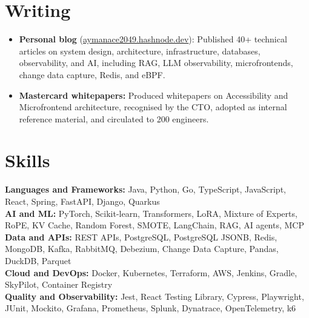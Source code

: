 \documentclass[a4paper,10pt]{article}
\newcommand{\skill}[2]{
  \textbf{#1:} #2
}
\begin{document}
\section{Writing}
\begin{itemize}
  \item \textbf{Personal blog} \small{(\href{https://aymanace2049.hashnode.dev}{aymanace2049.hashnode.dev})}: Published 40+ technical articles on system design, architecture, infrastructure, databases, observability, and AI, including RAG, LLM observability, microfrontends, change data capture, Redis, and eBPF.
  \item \textbf{Mastercard whitepapers:} Produced whitepapers on Accessibility and Microfrontend architecture, recognised by the CTO, adopted as internal reference material, and circulated to 200 engineers.
\end{itemize}

\section{Skills}
{\small
\skill{Languages and Frameworks}{Java, Python, Go, TypeScript, JavaScript, React, Spring, FastAPI, Django, Quarkus}\\
\skill{AI and ML}{PyTorch, Scikit-learn, Transformers, LoRA, Mixture of Experts, RoPE, KV Cache, Random Forest, SMOTE, LangChain, RAG, AI agents, MCP}\\
\skill{Data and APIs}{REST APIs, PostgreSQL, PostgreSQL JSONB, Redis, MongoDB, Kafka, RabbitMQ, Debezium, Change Data Capture, Pandas, DuckDB, Parquet}\\
\skill{Cloud and DevOps}{Docker, Kubernetes, Terraform, AWS, Jenkins, Gradle, SkyPilot, Container Registry}\\
\skill{Quality and Observability}{Jest, React Testing Library, Cypress, Playwright, JUnit, Mockito, Grafana, Prometheus, Splunk, Dynatrace, OpenTelemetry, k6}
}
\end{document}
